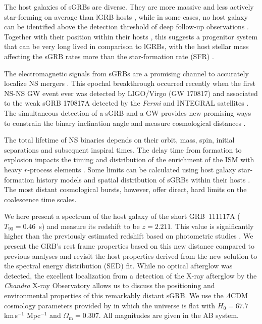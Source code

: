 \documentclass{aa}    %
\begin{document}
The host galaxies of sGRBs are diverse. They are more massive and less actively
star-forming on average than lGRB hosts \citep{Fong2013b}, while in some cases,
no host galaxy can be identified above the detection threshold of deep follow-up
observations \citep{Berger2010a, Tunnicliffe2014}. Together with their position
within their hosts \citep{Fong2013a}, this suggests a progenitor system that can
be very long lived in comparison to lGRBs, with the host stellar mass affecting
the sGRB rates more than the star-formation rate (SFR) \citep{Berger2014}.

The electromagnetic signals from sGRBs are a promising channel to accurately
localize NS mergers \citep{Ghirlanda2016}. This epochal breakthrough occurred
recently when the first NS-NS GW event ever was detected by LIGO/Virgo (GW
170817) and associated to the weak sGRB 170817A detected by the \textit{Fermi}
and INTEGRAL satellites \citep{LIGOScientificCollaboration2017a, Goldstein2017,
	Savchenko2017}. The simultaneous detection of a sGRB and a GW provides new
promising ways to constrain the binary inclination angle \citep{Arun2014,
	LIGOScientificCollaboration2017a} and measure cosmological distances
\citep{Nissanke2010, LIGOScientificCollaboration2017c}.

The total lifetime of NS binaries depends on their orbit, mass, spin, initial
separations and subsequent inspiral times. The delay time from formation to
explosion impacts the timing and distribution of the enrichment of the ISM with
heavy $r$-process elements \citep{VandeVoort2015, Wallner2015,  Ji2016}. Some
limits can be calculated using host galaxy star-formation history models and
spatial distribution of sGRBs within their hosts \citep[][]{Berger2014}. The
most distant cosmological bursts, however, offer direct, hard limits on the
coalescence time scales.

We here present a spectrum of the host galaxy of the short GRB~111117A
($T_{90}=0.46$~s) and measure its redshift to be $z=2.211$. This value is
significantly higher than the previously estimated redshift based on photometric
studies \citep{Margutti2012,Sakamoto2013}. We present the GRB's rest frame
properties based on this new distance compared to previous analyses and revisit
the host properties derived from the new solution to the spectral energy
distribution (SED) fit. While no optical afterglow was detected, the excellent
localization from a detection of the X-ray afterglow by the \emph{Chandra} X-ray
Observatory allows us to discuss the positioning and environmental properties of
this remarkably distant sGRB. We use the $\Lambda$CDM cosmology parameters
provided by \citet{Planck2015} in which the universe is flat with $H_0 =
67.7$\,km\,s$^{-1}$ Mpc$^{-1}$ and $\Omega_\mathrm{m} = 0.307$. All magnitudes
are given in the AB system.
\end{document}
